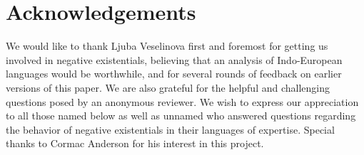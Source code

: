 \documentclass[output=paper,colorlinks,citecolor=brown]{langscibook}
\begin{document}
\section*{Acknowledgements}

We would like to thank Ljuba Veselinova first and foremost for getting us involved in negative existentials, believing that an analysis of Indo-European languages would be worthwhile, and for several rounds of feedback on earlier versions of this paper. We are also grateful for the helpful and challenging questions posed by an anonymous reviewer. We wish to express our appreciation to all those named below as well as unnamed who answered questions regarding the behavior of negative existentials in their languages of expertise. Special thanks to Cormac Anderson for his interest in this project.
\end{document}

